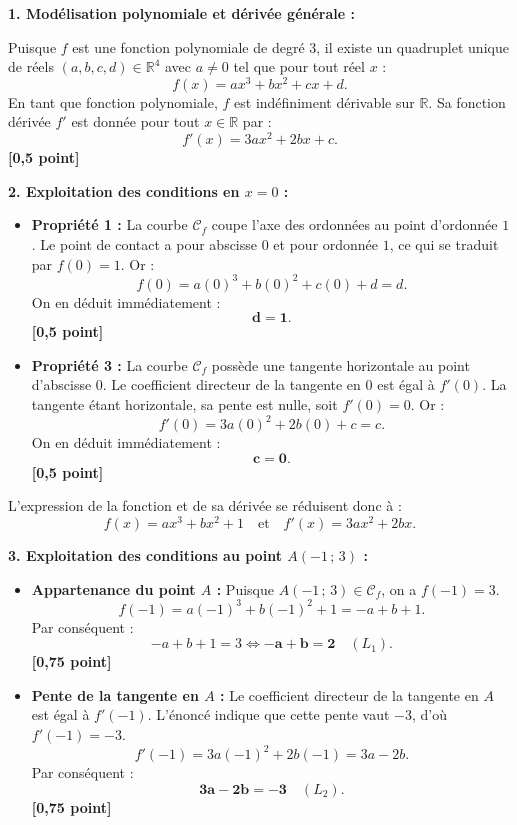 \documentclass[11pt,a4paper]{article}
\newcommand{\R}{\mathbb{R}}
\begin{document}
\begin{correctionbox}
\textbf{1. Modélisation polynomiale et dérivée générale :}

Puisque $f$ est une fonction polynomiale de degré 3, il existe un quadruplet unique de réels $(a, b, c, d) \in \R^4$ avec \textbf{$a \neq 0$} tel que pour tout réel $x$ :
\[
f(x) = ax^3 + bx^2 + cx + d.
\]
En tant que fonction polynomiale, $f$ est indéfiniment dérivable sur $\R$. Sa fonction dérivée $f'$ est donnée pour tout $x \in \R$ par :
\[
f'(x) = 3ax^2 + 2bx + c.
\]
\textbf{[0{,}5 point]}

\medskip
\textbf{2. Exploitation des conditions en $x = 0$ :}
\begin{itemize}[leftmargin=*]
    \item \textbf{Propriété 1 :} La courbe $\mathcal{C}_f$ coupe l'axe des ordonnées au point d'ordonnée $1$.
    Le point de contact a pour abscisse $0$ et pour ordonnée $1$, ce qui se traduit par $f(0) = 1$. Or :
    \[
    f(0) = a(0)^3 + b(0)^2 + c(0) + d = d.
    \]
    On en déduit immédiatement :
    \[
    \mathbf{d = 1}.
    \] \hfill \textbf{[0{,}5 point]}
    \item \textbf{Propriété 3 :} La courbe $\mathcal{C}_f$ possède une tangente horizontale au point d'abscisse $0$.
    Le coefficient directeur de la tangente en $0$ est égal à $f'(0)$. La tangente étant horizontale, sa pente est nulle, soit $f'(0) = 0$. Or :
    \[
    f'(0) = 3a(0)^2 + 2b(0) + c = c.
    \]
    On en déduit immédiatement :
    \[
    \mathbf{c = 0}.
    \] \hfill \textbf{[0{,}5 point]}
\end{itemize}
L'expression de la fonction et de sa dérivée se réduisent donc à :
\[
f(x) = ax^3 + bx^2 + 1 \quad \text{et} \quad f'(x) = 3ax^2 + 2bx.
\]

\medskip
\textbf{3. Exploitation des conditions au point $A(-1\,;\,3)$ :}
\begin{itemize}[leftmargin=*]
    \item \textbf{Appartenance du point $A$ :} Puisque $A(-1\,;\,3) \in \mathcal{C}_f$, on a $f(-1) = 3$.
    \[
    f(-1) = a(-1)^3 + b(-1)^2 + 1 = -a + b + 1.
    \]
    Par conséquent :
    \[
    -a + b + 1 = 3 \iff \mathbf{-a + b = 2} \quad (L_1).
    \] \hfill \textbf{[0{,}75 point]}
    \item \textbf{Pente de la tangente en $A$ :} Le coefficient directeur de la tangente en $A$ est égal à $f'(-1)$. L'énoncé indique que cette pente vaut $-3$, d'où $f'(-1) = -3$.
    \[
    f'(-1) = 3a(-1)^2 + 2b(-1) = 3a - 2b.
    \]
    Par conséquent :
    \[
    \mathbf{3a - 2b = -3} \quad (L_2).
    \] \hfill \textbf{[0{,}75 point]}
\end{itemize}


\end{correctionbox}
\end{document}
